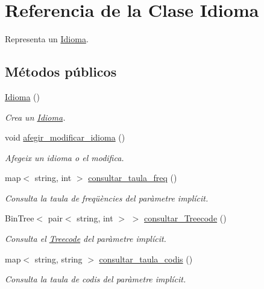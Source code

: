 \hypertarget{class_idioma}{}\section{Referencia de la Clase Idioma}
\label{class_idioma}


Representa un \hyperlink{class_idioma}{Idioma}.  


\subsection*{Métodos públicos}
\begin{DoxyCompactItemize}
\item 
\hyperlink{class_idioma_a6722a621ce03825772493e67e5a17215}{Idioma} ()
\begin{DoxyCompactList}\small\item\em Crea un \hyperlink{class_idioma}{Idioma}. \end{DoxyCompactList}\item 
void \hyperlink{class_idioma_a02661047ff31660f333b54f6d288ff19}{afegir\+\_\+modificar\+\_\+idioma} ()
\begin{DoxyCompactList}\small\item\em Afegeix un idioma o el modifica. \end{DoxyCompactList}\item 
map$<$ string, int $>$ \hyperlink{class_idioma_a98badc57cda44db5069ac044323b8383}{consultar\+\_\+taula\+\_\+freq} ()
\begin{DoxyCompactList}\small\item\em Consulta la taula de freqüències del paràmetre implícit. \end{DoxyCompactList}\item 
Bin\+Tree$<$ pair$<$ string, int $>$ $>$ \hyperlink{class_idioma_aca3c9e20f1900ad58ba58fe3112350fe}{consultar\+\_\+\+Treecode} ()
\begin{DoxyCompactList}\small\item\em Consulta el \hyperlink{class_treecode}{Treecode} del paràmetre implícit. \end{DoxyCompactList}\item 
map$<$ string, string $>$ \hyperlink{class_idioma_a5cb257a60b1ee7cc6b912de01913117e}{consultar\+\_\+taula\+\_\+codis} ()
\begin{DoxyCompactList}\small\item\em Consulta la taula de codis del paràmetre implícit. \end{DoxyCompactList}\end{DoxyCompactItemize}


